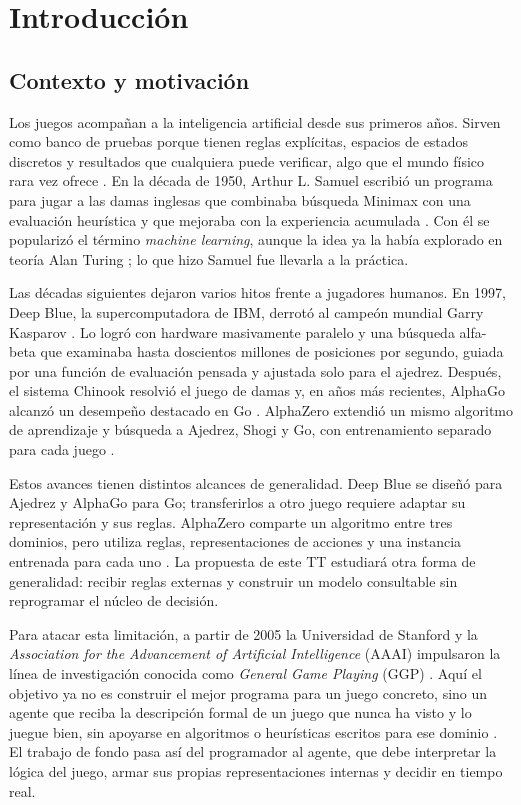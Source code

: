 \chapter{Introducción}
\label{ch:introduccion}

\section{Contexto y motivación}

Los juegos acompañan a la inteligencia artificial desde sus primeros años. Sirven como banco de pruebas porque tienen reglas explícitas, espacios de estados discretos y resultados que cualquiera puede verificar, algo que el mundo físico rara vez ofrece \cite{RussellNorvig2010}. En la década de 1950, Arthur L. Samuel escribió un programa para jugar a las damas inglesas que combinaba búsqueda Minimax con una evaluación heurística y que mejoraba con la experiencia acumulada \cite{Samuel1959}. Con él se popularizó el término \textit{machine learning}, aunque la idea ya la había explorado en teoría Alan Turing \cite{Turing1950}; lo que hizo Samuel fue llevarla a la práctica.

Las décadas siguientes dejaron varios hitos frente a jugadores humanos. En 1997, Deep Blue, la supercomputadora de IBM, derrotó al campeón mundial Garry Kasparov \cite{Campbell2002DeepBlue}. Lo logró con hardware masivamente paralelo y una búsqueda alfa-beta que examinaba hasta doscientos millones de posiciones por segundo, guiada por una función de evaluación pensada y ajustada solo para el ajedrez. Después, el sistema Chinook resolvió el juego de damas \cite{Schaeffer2007Checkers} y, en años más recientes, AlphaGo alcanzó un desempeño destacado en Go \cite{Silver2016AlphaGo}. AlphaZero extendió un mismo algoritmo de aprendizaje y búsqueda a Ajedrez, Shogi y Go, con entrenamiento separado para cada juego \cite{Silver2018AlphaZero}.

Estos avances tienen distintos alcances de generalidad. Deep Blue se diseñó para Ajedrez y AlphaGo para Go; transferirlos a otro juego requiere adaptar su representación y sus reglas. AlphaZero comparte un algoritmo entre tres dominios, pero utiliza reglas, representaciones de acciones y una instancia entrenada para cada uno \cite{Silver2018AlphaZero}. La propuesta de este TT estudiará otra forma de generalidad: recibir reglas externas y construir un modelo consultable sin reprogramar el núcleo de decisión.

Para atacar esta limitación, a partir de 2005 la Universidad de Stanford y la \textit{Association for the Advancement of Artificial Intelligence} (AAAI) impulsaron la línea de investigación conocida como \textit{General Game Playing} (GGP) \cite{Genesereth2005GGP, GeneserethThielscher2014}. Aquí el objetivo ya no es construir el mejor programa para un juego concreto, sino un agente que reciba la descripción formal de un juego que nunca ha visto y lo juegue bien, sin apoyarse en algoritmos o heurísticas escritos para ese dominio \cite{Love2008GDL}. El trabajo de fondo pasa así del programador al agente, que debe interpretar la lógica del juego, armar sus propias representaciones internas y decidir en tiempo real.

